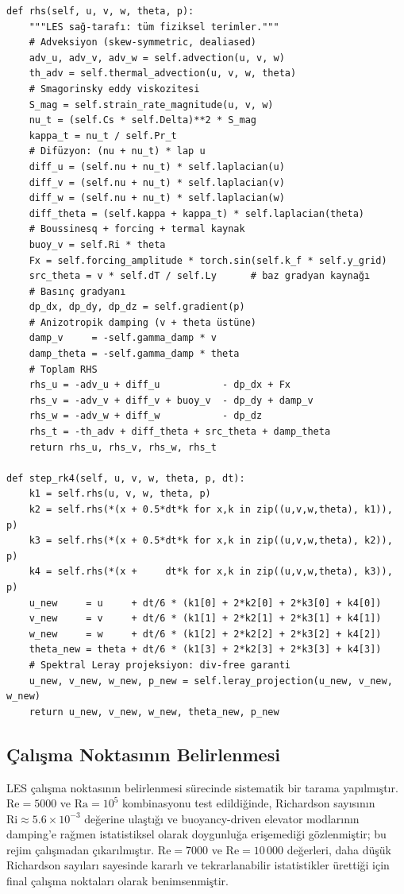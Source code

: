 \begin{lstlisting}[caption={LES çözücüsü RK4 adımı (özet). Tam dosya: \texttt{les\_solver.py}.}, label={code:les_step}]
def rhs(self, u, v, w, theta, p):
    """LES sağ-tarafı: tüm fiziksel terimler."""
    # Adveksiyon (skew-symmetric, dealiased)
    adv_u, adv_v, adv_w = self.advection(u, v, w)
    th_adv = self.thermal_advection(u, v, w, theta)
    # Smagorinsky eddy viskozitesi
    S_mag = self.strain_rate_magnitude(u, v, w)
    nu_t = (self.Cs * self.Delta)**2 * S_mag
    kappa_t = nu_t / self.Pr_t
    # Difüzyon: (nu + nu_t) * lap u
    diff_u = (self.nu + nu_t) * self.laplacian(u)
    diff_v = (self.nu + nu_t) * self.laplacian(v)
    diff_w = (self.nu + nu_t) * self.laplacian(w)
    diff_theta = (self.kappa + kappa_t) * self.laplacian(theta)
    # Boussinesq + forcing + termal kaynak
    buoy_v = self.Ri * theta
    Fx = self.forcing_amplitude * torch.sin(self.k_f * self.y_grid)
    src_theta = v * self.dT / self.Ly      # baz gradyan kaynağı
    # Basınç gradyanı
    dp_dx, dp_dy, dp_dz = self.gradient(p)
    # Anizotropik damping (v + theta üstüne)
    damp_v     = -self.gamma_damp * v
    damp_theta = -self.gamma_damp * theta
    # Toplam RHS
    rhs_u = -adv_u + diff_u           - dp_dx + Fx
    rhs_v = -adv_v + diff_v + buoy_v  - dp_dy + damp_v
    rhs_w = -adv_w + diff_w           - dp_dz
    rhs_t = -th_adv + diff_theta + src_theta + damp_theta
    return rhs_u, rhs_v, rhs_w, rhs_t

def step_rk4(self, u, v, w, theta, p, dt):
    k1 = self.rhs(u, v, w, theta, p)
    k2 = self.rhs(*(x + 0.5*dt*k for x,k in zip((u,v,w,theta), k1)), p)
    k3 = self.rhs(*(x + 0.5*dt*k for x,k in zip((u,v,w,theta), k2)), p)
    k4 = self.rhs(*(x +     dt*k for x,k in zip((u,v,w,theta), k3)), p)
    u_new     = u     + dt/6 * (k1[0] + 2*k2[0] + 2*k3[0] + k4[0])
    v_new     = v     + dt/6 * (k1[1] + 2*k2[1] + 2*k3[1] + k4[1])
    w_new     = w     + dt/6 * (k1[2] + 2*k2[2] + 2*k3[2] + k4[2])
    theta_new = theta + dt/6 * (k1[3] + 2*k2[3] + 2*k3[3] + k4[3])
    # Spektral Leray projeksiyon: div-free garanti
    u_new, v_new, w_new, p_new = self.leray_projection(u_new, v_new, w_new)
    return u_new, v_new, w_new, theta_new, p_new
\end{lstlisting}

\subsection{Çalışma Noktasının Belirlenmesi}

LES çalışma noktasının belirlenmesi sürecinde sistematik bir tarama yapılmıştır. $\mathrm{Re}=5000$ ve $\mathrm{Ra}=10^{5}$ kombinasyonu test edildiğinde, Richardson sayısının $\mathrm{Ri}\approx 5.6\times 10^{-3}$ değerine ulaştığı ve buoyancy-driven elevator modlarının damping'e rağmen istatistiksel olarak doygunluğa erişemediği gözlenmiştir; bu rejim çalışmadan çıkarılmıştır. $\mathrm{Re}=7000$ ve $\mathrm{Re}=10\,000$ değerleri, daha düşük Richardson sayıları sayesinde kararlı ve tekrarlanabilir istatistikler ürettiği için final çalışma noktaları olarak benimsenmiştir.

